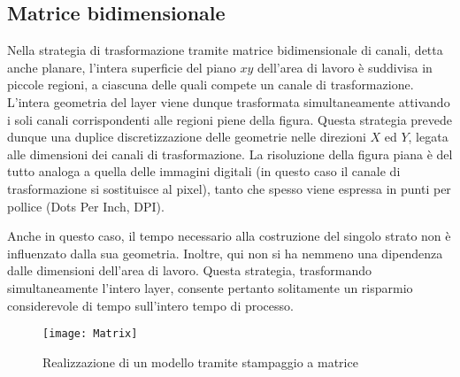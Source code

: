 \subsection{Matrice bidimensionale}
Nella strategia di trasformazione tramite matrice bidimensionale di canali, detta anche planare, l'intera superficie del piano $xy$ dell'area di lavoro è suddivisa in piccole regioni, a ciascuna delle quali compete un canale di trasformazione.
L'intera geometria del layer viene dunque trasformata simultaneamente attivando i soli canali corrispondenti alle regioni piene della figura.
Questa strategia prevede dunque una duplice discretizzazione delle geometrie nelle direzioni $X$ ed $Y$, legata alle dimensioni dei canali di trasformazione.
La risoluzione della figura piana è del tutto analoga a quella delle immagini digitali (in questo caso il canale di trasformazione si sostituisce al pixel), tanto che spesso viene espressa in punti per pollice (Dots Per Inch, DPI).

Anche in questo caso, il tempo necessario alla costruzione del singolo strato non è influenzato dalla sua geometria.
Inoltre, qui non si ha nemmeno una dipendenza dalle dimensioni dell'area di lavoro.
Questa strategia, trasformando simultaneamente l'intero layer, consente pertanto solitamente un risparmio considerevole di tempo sull'intero tempo di processo.
\begin{figure}
\centering
\texttt{[image: Matrix]}
\caption{Realizzazione di un modello tramite stampaggio a matrice}
\label{fig:Matrix}
\end{figure}
